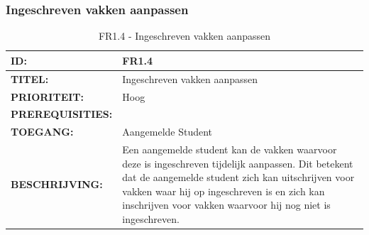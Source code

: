 \subsubsection{Ingeschreven vakken aanpassen}
\noindent\begin{table}[H]
            \begin{tabular}{l | p{10cm}}
                \textbf{ID:} & FR1.4\\ \hline
                \textbf{TITEL:} & Ingeschreven vakken aanpassen\\ \hline
                \textbf{PRIORITEIT:} &  Hoog \\ \hline
                \textbf{PREREQUISITIES:} & \\ \hline
                \textbf{TOEGANG:} &  Aangemelde Student \\ \hline
                \textbf{BESCHRIJVING:} & Een aangemelde student kan de vakken waarvoor deze is ingeschreven tijdelijk aanpassen. 
                						Dit betekent dat de aangemelde student zich kan uitschrijven voor vakken waar hij op ingeschreven is en  zich kan inschrijven voor vakken waarvoor hij nog niet is ingeschreven.\\
            \end{tabular}\\
            \caption{FR1.4 - Ingeschreven vakken aanpassen}
            \label{tab:FR1.4 - Ingeschreven vakken aanpassen}
        \end{table}
        

